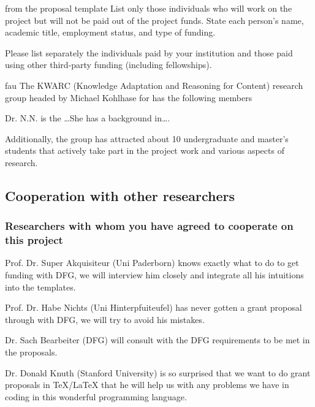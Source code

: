 \begin{todo}{from the proposal template}
List only those individuals who will work on the project but will not be paid out of the
project funds. State each person’s name, academic title, employment status, and type
of funding.

Please list separately the individuals paid by your institution and those paid using other
third-party funding (including fellowships).
\end{todo}
\begin{sitedescription}{fau}
The KWARC (Knowledge Adaptation and Reasoning for Content) research group headed by
Michael Kohlhase for has the following members
\begin{compactdesc}
\item[Dr. N.N.] is the \ldots She has a background in\ldots.
\end{compactdesc}
Additionally, the group has attracted about 10 undergraduate and master's students that
actively take part in the project work and various aspects of research.
\end{sitedescription}


\subsection{Cooperation with other researchers }

\subsubsection{Researchers with whom you have agreed to cooperate on this project }

\begin{compactdesc}
\item[Prof. Dr. Super Akquisiteur (Uni Paderborn)] knows exactly what to do to get funding
  with DFG, we will interview him closely and integrate all his intuitions into the
  {\pn} templates.
\item[Prof. Dr. Habe Nichts (Uni Hinterpfuiteufel)] has never gotten a grant proposal
  through with DFG, we will try to avoid his mistakes.
\item[Dr. Sach Bearbeiter (DFG)] will consult with the DFG requirements to be met in the
  proposals.
\item[Dr. Donald Knuth (Stanford University)] is so surprised that we want to do grant
  proposals in {\TeX/\LaTeX} that he will help us with any problems we have in coding in
  this wonderful programming language.
\end{compactdesc}

